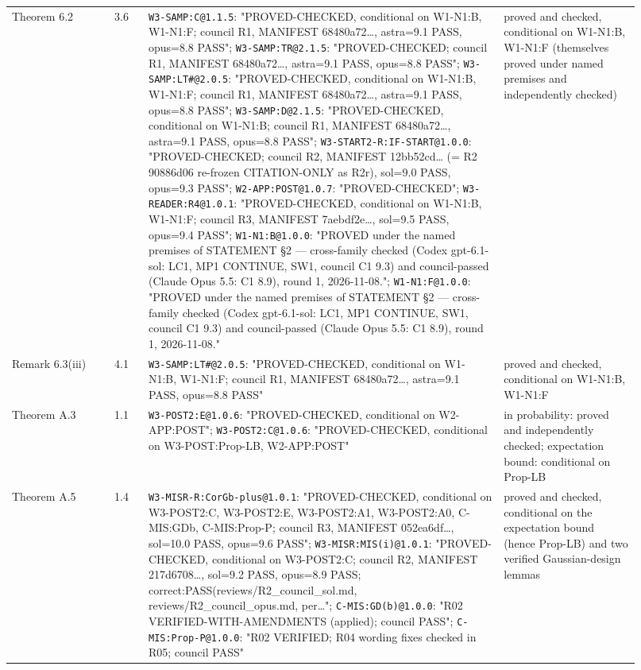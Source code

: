 \begin{longtable}{@{}p{0.15\linewidth}p{0.05\linewidth}p{0.52\linewidth}p{0.2\linewidth}@{}}
Theorem 6.2 & 3.6 & \texttt{W3-SAMP:C@1.1.5}: "PROVED-CHECKED, conditional on W1-N1:B, W1-N1:F; council R1, MANIFEST 68480a72\ldots{}, astra=9.1 PASS, opus=8.8 PASS"; \texttt{W3-SAMP:TR@2.1.5}: "PROVED-CHECKED; council R1, MANIFEST 68480a72\ldots{}, astra=9.1 PASS, opus=8.8 PASS"; \texttt{W3-SAMP:LT\#@2.0.5}: "PROVED-CHECKED, conditional on W1-N1:B, W1-N1:F; council R1, MANIFEST 68480a72\ldots{}, astra=9.1 PASS, opus=8.8 PASS"; \texttt{W3-SAMP:D@2.1.5}: "PROVED-CHECKED, conditional on W1-N1:B; council R1, MANIFEST 68480a72\ldots{}, astra=9.1 PASS, opus=8.8 PASS"; \texttt{W3-START2-R:IF-START@1.0.0}: "PROVED-CHECKED; council R2, MANIFEST 12bb52cd\ldots{} (= R2 90886d06 re-frozen CITATION-ONLY as R2r), sol=9.0 PASS, opus=9.3 PASS"; \texttt{W2-APP:POST@1.0.7}: "PROVED-CHECKED"; \texttt{W3-READER:R4@1.0.1}: "PROVED-CHECKED, conditional on W1-N1:B, W1-N1:F; council R3, MANIFEST 7aebdf2e\ldots{}, sol=9.5 PASS, opus=9.4 PASS"; \texttt{W1-N1:B@1.0.0}: "PROVED under the named premises of STATEMENT §2 — cross-family checked (Codex gpt-6.1-sol: LC1, MP1 CONTINUE, SW1, council C1 9.3) and council-passed (Claude Opus 5.5: C1 8.9), round 1, 2026-11-08."; \texttt{W1-N1:F@1.0.0}: "PROVED under the named premises of STATEMENT §2 — cross-family checked (Codex gpt-6.1-sol: LC1, MP1 CONTINUE, SW1, council C1 9.3) and council-passed (Claude Opus 5.5: C1 8.9), round 1, 2026-11-08." & proved and checked, conditional on W1-N1:B, W1-N1:F (themselves proved under named premises and independently checked) \\
Remark 6.3(iii) & 4.1 & \texttt{W3-SAMP:LT\#@2.0.5}: "PROVED-CHECKED, conditional on W1-N1:B, W1-N1:F; council R1, MANIFEST 68480a72\ldots{}, astra=9.1 PASS, opus=8.8 PASS" & proved and checked, conditional on W1-N1:B, W1-N1:F \\
Theorem A.3 & 1.1 & \texttt{W3-POST2:E@1.0.6}: "PROVED-CHECKED, conditional on W2-APP:POST"; \texttt{W3-POST2:C@1.0.6}: "PROVED-CHECKED, conditional on W3-POST:Prop-LB, W2-APP:POST" & in probability: proved and independently checked; expectation bound: conditional on Prop-LB \\
Theorem A.5 & 1.4 & \texttt{W3-MISR-R:CorGb-plus@1.0.1}: "PROVED-CHECKED, conditional on W3-POST2:C, W3-POST2:E, W3-POST2:A1, W3-POST2:A0, C-MIS:GDb, C-MIS:Prop-P; council R3, MANIFEST 052ea6df\ldots{}, sol=10.0 PASS, opus=9.6 PASS"; \texttt{W3-MISR:MIS(i)@1.0.1}: "PROVED-CHECKED, conditional on W3-POST2:C; council R2, MANIFEST 217d6708\ldots{}, sol=9.2 PASS, opus=8.9 PASS; correct:PASS(reviews/R2\_council\_sol.md, reviews/R2\_council\_opus.md, per\ldots{}"; \texttt{C-MIS:GD(b)@1.0.0}: "R02 VERIFIED-WITH-AMENDMENTS (applied); council PASS"; \texttt{C-MIS:Prop-P@1.0.0}: "R02 VERIFIED; R04 wording fixes checked in R05; council PASS" & proved and checked, conditional on the expectation bound (hence Prop-LB) and two verified Gaussian-design lemmas \\

\end{longtable}
